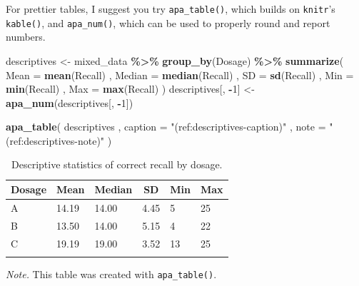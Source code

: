 \documentclass[
  man,floatsintext]{apa6}
\newenvironment{Shaded}{\begin{snugshade}}{\end{snugshade}}
\newcommand{\AttributeTok}[1]{\textcolor[rgb]{0.13,0.29,0.53}{#1}}
\newcommand{\DecValTok}[1]{\textcolor[rgb]{0.00,0.00,0.81}{#1}}
\newcommand{\FunctionTok}[1]{\textcolor[rgb]{0.13,0.29,0.53}{\textbf{#1}}}
\newcommand{\NormalTok}[1]{#1}
\newcommand{\OtherTok}[1]{\textcolor[rgb]{0.56,0.35,0.01}{#1}}
\newcommand{\SpecialCharTok}[1]{\textcolor[rgb]{0.81,0.36,0.00}{\textbf{#1}}}
\newcommand{\StringTok}[1]{\textcolor[rgb]{0.31,0.60,0.02}{#1}}
\begin{document}
For prettier tables, I suggest you try \texttt{apa\_table()}, which builds on \texttt{knitr}'s \texttt{kable()}, and \texttt{apa\_num()}, which can be used to properly round and report numbers.





\begin{Shaded}
\begin{Highlighting}[]
\NormalTok{descriptives }\OtherTok{\textless{}{-}}\NormalTok{ mixed\_data }\SpecialCharTok{\%\textgreater{}\%}
  \FunctionTok{group\_by}\NormalTok{(Dosage) }\SpecialCharTok{\%\textgreater{}\%}
  \FunctionTok{summarize}\NormalTok{(}
    \AttributeTok{Mean =} \FunctionTok{mean}\NormalTok{(Recall)}
\NormalTok{    , }\AttributeTok{Median =} \FunctionTok{median}\NormalTok{(Recall)}
\NormalTok{    , }\AttributeTok{SD =} \FunctionTok{sd}\NormalTok{(Recall)}
\NormalTok{    , }\AttributeTok{Min =} \FunctionTok{min}\NormalTok{(Recall)}
\NormalTok{    , }\AttributeTok{Max =} \FunctionTok{max}\NormalTok{(Recall)}
\NormalTok{  )}
\NormalTok{descriptives[, }\SpecialCharTok{{-}}\DecValTok{1}\NormalTok{] }\OtherTok{\textless{}{-}} \FunctionTok{apa\_num}\NormalTok{(descriptives[, }\SpecialCharTok{{-}}\DecValTok{1}\NormalTok{])}

\FunctionTok{apa\_table}\NormalTok{(}
\NormalTok{  descriptives}
\NormalTok{  , }\AttributeTok{caption =} \StringTok{"(ref:descriptives{-}caption)"}
\NormalTok{  , }\AttributeTok{note =} \StringTok{"(ref:descriptives{-}note)"}
\NormalTok{)}
\end{Highlighting}
\end{Shaded}

\begin{table}[tbp]

\begin{center}
\begin{threeparttable}

\caption{\label{tab:descriptives}Descriptive statistics of correct recall by dosage.}

\begin{tabular}{llllll}
\toprule
Dosage & \multicolumn{1}{c}{Mean} & \multicolumn{1}{c}{Median} & \multicolumn{1}{c}{SD} & \multicolumn{1}{c}{Min} & \multicolumn{1}{c}{Max}\\
\midrule
A & 14.19 & 14.00 & 4.45 & 5 & 25\\
B & 13.50 & 14.00 & 5.15 & 4 & 22\\
C & 19.19 & 19.00 & 3.52 & 13 & 25\\
\bottomrule
\addlinespace
\end{tabular}

\begin{tablenotes}[para]
\normalsize{\textit{Note.} This table was created with \texttt{apa\_table()}.}
\end{tablenotes}

\end{threeparttable}
\end{center}

\end{table}
\end{document}
